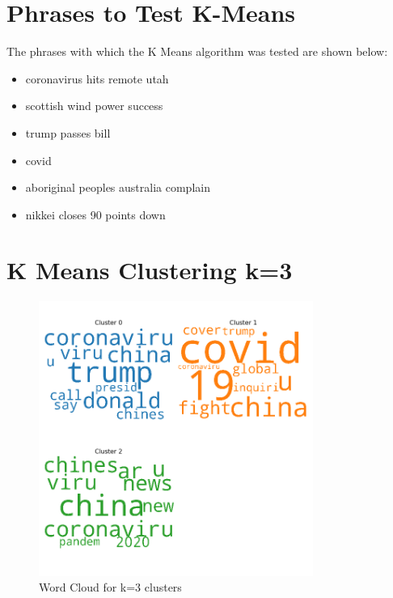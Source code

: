 \appendix



\begin{appendices}
	\section{Phrases to Test K-Means}
	The phrases with which the K Means algorithm was tested are shown below:
	\label{phrases}
\renewcommand\labelitemi{---}
	\begin{itemize}
\item 			 coronavirus hits remote utah
		\item scottish wind power success 
\item 		trump passes bill
		\item covid
		\item aboriginal peoples australia complain
		\item nikkei closes 90 points down
	\end{itemize}

	\section{K Means Clustering k=3}
	\label{k3}
	\begin{figure}[H]
		\centering
		\includegraphics[width=0.8\textwidth]{images/kmeans_word_cloud_k=3.png}
		\caption{Word Cloud for k=3 clusters}
		\label{fig:wck3}
	\end{figure}
	

\end{appendices}
